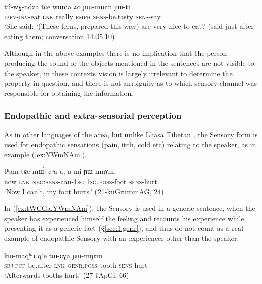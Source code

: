 \begin{exe}
\ex \label{ex:YWmWm}
\gll tú-wɣ-ndza tɕe wuma ʑo ɲɯ-mɯm ɲɯ-ti \\
\textsc{ipfv}-\textsc{inv}-eat \textsc{lnk} really \textsc{emph} \textsc{sens}-be.tasty \textsc{sens}-say \\
\glt `She said: `(These ferns, prepared this way) are very nice to eat'.' (said just after eating them; conversation 14.05.10)
\end{exe}

Although in the above examples there is no implication that the person producing the sound or the objects mentioned in the sentences are not visible to the speaker, in these contexts vision is largely irrelevant to determine the property in question, and there is not ambiguity as to which sensory channel was responsible for obtaining the information.  


\subsubsection{Endopathic and extra-sensorial perception} \label{sec:sensory.endopathic}
As in other languages of the area, but unlike Lhasa Tibetan \citep{tournadre14evidentiality}, the Sensory form is used for endopathic sensations (pain, itch, cold etc)  relating to the speaker, as in example (\ref{ex:YWmNAm}).

\begin{exe}
\ex \label{ex:YWmNAm}
\gll tʰam tɕe mɯ́j-cʰa-a, a-mi ɲɯ-mŋɤm. \\
now \textsc{lnk} \textsc{neg}:\textsc{sens}-can-\textsc{1sg} \textsc{1sg}.\textsc{poss}-foot \textsc{sens}-hurt \\
\glt `Now I can't, my foot hurts.' (21-kuGrummAG, 24)
\end{exe}


In (\ref{ex:tWCGa.YWmNAm}), the Sensory is used in a generic sentence, when the speaker has experienced himself the feeling and recounts his experience while presenting it as a generic fact (§\ref{sec:1.genr}), and thus do not count as a real example of endopathic Sensory with an experiencer other than the speaker.

\begin{exe}
\ex \label{ex:tWCGa.YWmNAm}
\gll kɯ-maqʰu qʰe tɯ-ɕɣa ɲɯ-mŋɤm \\
\textsc{sbj}:\textsc{pcp}-be.after \textsc{lnk} \textsc{genr}.\textsc{poss}-tooth \textsc{sens}-hurt \\
\glt `Afterwards tooths hurt.' (27 tApGi, 66)
\end{exe}

